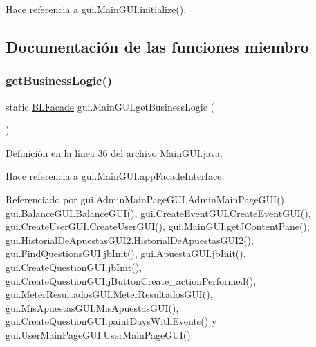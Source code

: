 Hace referencia a gui.\+Main\+G\+U\+I.\+initialize().



\subsection{Documentación de las funciones miembro}
\mbox{\label{classgui_1_1MainGUI_a6bf91459a9057be4e59d27595cc65c79}} 
\subsubsection{\texorpdfstring{getBusinessLogic()}{getBusinessLogic()}}
{\footnotesize\ttfamily static \mbox{\hyperlink{interfacebusinessLogic_1_1BLFacade}{B\+L\+Facade}} gui.\+Main\+G\+U\+I.\+get\+Business\+Logic (\begin{DoxyParamCaption}{ }\end{DoxyParamCaption})\hspace{0.3cm}{\ttfamily [static]}}



Definición en la línea 36 del archivo Main\+G\+U\+I.\+java.


\begin{DoxyCode}{0}

\end{DoxyCode}


Hace referencia a gui.\+Main\+G\+U\+I.\+app\+Facade\+Interface.



Referenciado por gui.\+Admin\+Main\+Page\+G\+U\+I.\+Admin\+Main\+Page\+G\+U\+I(), gui.\+Balance\+G\+U\+I.\+Balance\+G\+U\+I(), gui.\+Create\+Event\+G\+U\+I.\+Create\+Event\+G\+U\+I(), gui.\+Create\+User\+G\+U\+I.\+Create\+User\+G\+U\+I(), gui.\+Main\+G\+U\+I.\+get\+J\+Content\+Pane(), gui.\+Historial\+De\+Apuestas\+G\+U\+I2.\+Historial\+De\+Apuestas\+G\+U\+I2(), gui.\+Find\+Questions\+G\+U\+I.\+jb\+Init(), gui.\+Apuesta\+G\+U\+I.\+jb\+Init(), gui.\+Create\+Question\+G\+U\+I.\+jb\+Init(), gui.\+Create\+Question\+G\+U\+I.\+j\+Button\+Create\+\_\+action\+Performed(), gui.\+Meter\+Resultados\+G\+U\+I.\+Meter\+Resultados\+G\+U\+I(), gui.\+Mis\+Apuestas\+G\+U\+I.\+Mis\+Apuestas\+G\+U\+I(), gui.\+Create\+Question\+G\+U\+I.\+paint\+Days\+With\+Events() y gui.\+User\+Main\+Page\+G\+U\+I.\+User\+Main\+Page\+G\+U\+I().

